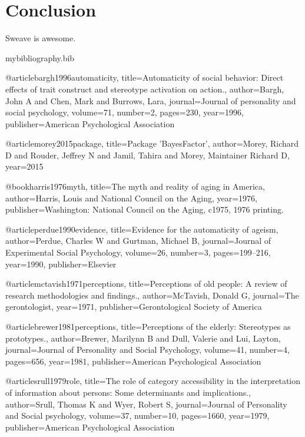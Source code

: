\documentclass[a4paper,man,natbib,floatsintext]{apa6}\usepackage[]{graphicx}\usepackage[]{color}
\begin{document}
\section{Conclusion}

Sweave is awesome.

\begin{filecontents}{mybibliography.bib}

@article{bargh1996automaticity,
  title={Automaticity of social behavior: Direct effects of trait construct and stereotype activation on action.},
  author={Bargh, John A and Chen, Mark and Burrows, Lara},
  journal={Journal of personality and social psychology},
  volume={71},
  number={2},
  pages={230},
  year={1996},
  publisher={American Psychological Association}
}

@article{morey2015package,
  title={Package 'BayesFactor'},
  author={Morey, Richard D and Rouder, Jeffrey N and Jamil, Tahira and Morey, Maintainer Richard D},
  year={2015}
}

@book{harris1976myth,
  title={The myth and reality of aging in America},
  author={Harris, Louis and National Council on the Aging},
  year={1976},
  publisher={Washington: National Council on the Aging, c1975, 1976 printing.}
}

@article{perdue1990evidence,
  title={Evidence for the automaticity of ageism},
  author={Perdue, Charles W and Gurtman, Michael B},
  journal={Journal of Experimental Social Psychology},
  volume={26},
  number={3},
  pages={199--216},
  year={1990},
  publisher={Elsevier}
}

@article{mctavish1971perceptions,
  title={Perceptions of old people: A review of research methodologies and findings.},
  author={McTavish, Donald G},
  journal={The gerontologist},
  year={1971},
  publisher={Gerontological Society of America}
}


@article{brewer1981perceptions,
  title={Perceptions of the elderly: Stereotypes as prototypes.},
  author={Brewer, Marilynn B and Dull, Valerie and Lui, Layton},
  journal={Journal of Personality and Social Psychology},
  volume={41},
  number={4},
  pages={656},
  year={1981},
  publisher={American Psychological Association}
}

@article{srull1979role,
  title={The role of category accessibility in the interpretation of information about persons: Some determinants and implications.},
  author={Srull, Thomas K and Wyer, Robert S},
  journal={Journal of Personality and Social psychology},
  volume={37},
  number={10},
  pages={1660},
  year={1979},
  publisher={American Psychological Association}
}

\end{filecontents}



\end{document}
